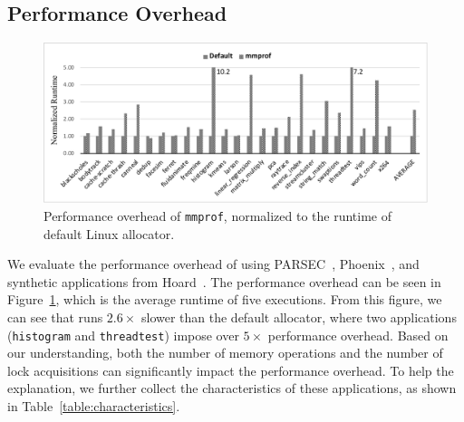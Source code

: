  








\subsection{Performance Overhead}
\label{sec:perf}

\begin{figure}[!ht]
\centering
\includegraphics[width=\columnwidth]{figures/perfoverhead}
\caption{Performance overhead of \texttt{mmprof}, normalized to the runtime of default Linux allocator.\label{fig:overhead}}
\end{figure}

We evaluate the performance overhead of 
\MP{} using PARSEC~\citep{parsec},  Phoenix~\citep{phoenix}, and synthetic applications from Hoard~\cite{Hoard}. The performance overhead can be seen in Figure~\ref{fig:overhead}, which is the average runtime of five executions. From this figure, we can see that \MP{} runs $2.6\times$ slower than the default allocator, where two applications (\texttt{histogram} and \texttt{threadtest}) impose over $5\times$ performance overhead. Based on our understanding, both the number of memory operations and the number of lock acquisitions can significantly impact the performance overhead. To help the explanation, we further collect the characteristics of these applications, as shown in Table~\ref{table:characteristics}.  

